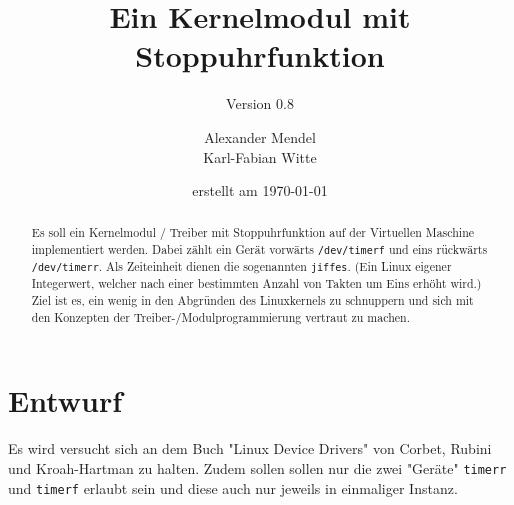 \documentclass[
   draft=false
  ,paper=a4
  ,twoside=false
  ,fontsize=11pt
  ,headsepline
  ,BCOR10mm
  ,DIV11
  ,parskip=full+
]{scrartcl} %
\begin{document}
\titlehead{Betriebssysteme WS 2016 Praktikum 04}%
\subject{BS Praktikumsaufgabe 04}
\title{Ein Kernelmodul mit Stoppuhrfunktion}
\subtitle{Version 0.8}
\author{Alexander Mendel \\ Karl-Fabian Witte}
\date{erstellt am \today}%
\maketitle%
\begin{abstract}
    Es soll ein Kernelmodul / Treiber  mit Stoppuhrfunktion auf der
    Virtuellen Maschine implementiert werden. Dabei zählt ein Gerät vorwärts
    \texttt{/dev/timerf} und eins rückwärts \texttt{/dev/timerr}. Als
    Zeiteinheit dienen die sogenannten \texttt{jiffes}. (Ein Linux eigener 
    Integerwert, welcher nach einer bestimmten Anzahl von Takten um Eins 
    erhöht wird.)
    Ziel ist es, ein wenig in den Abgründen des Linuxkernels zu schnuppern und
    sich mit den Konzepten der Treiber-/Modulprogrammierung vertraut 
    zu machen.
\end{abstract}
\tableofcontents
\flushleft

\section{Entwurf}
Es wird versucht sich an dem Buch "{}Linux Device Drivers"{} von Corbet,
Rubini und Kroah-Hartman zu halten. Zudem sollen sollen nur die zwei 
"{}Geräte"{} \texttt{timerr} und \texttt{timerf} erlaubt sein und diese auch 
nur jeweils in einmaliger Instanz. 
\end{document}
